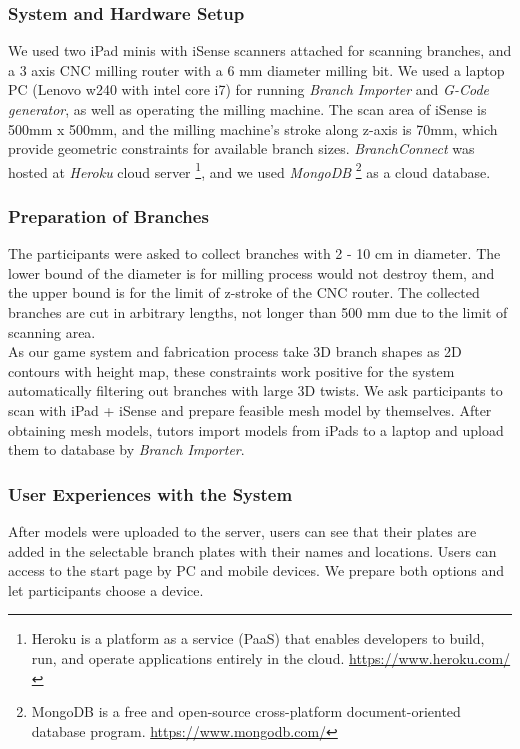 \subsubsection*{System and Hardware Setup}
We used two iPad minis with iSense scanners attached for scanning branches, and a 3 axis CNC milling router with a 6 mm diameter milling bit.
We used a laptop PC (Lenovo w240 with intel core i7) for running \textit{Branch Importer} and \textit{G-Code generator}, as well as operating the milling machine.
The scan area of iSense is 500mm x 500mm, and the milling machine's stroke along z-axis is 70mm, which provide geometric constraints for available branch sizes.
\textit{BranchConnect} was hosted at \textit{Heroku} cloud server \footnote{ Heroku is a platform as a service (PaaS) that enables developers to build, run, and operate applications entirely in the cloud. \url{https://www.heroku.com/}},
and we used \textit{MongoDB} \footnote{ MongoDB is a free and open-source cross-platform document-oriented database program. \url{https://www.mongodb.com/}} as a cloud database.

\subsubsection*{Preparation of Branches}
The participants were asked to collect branches with 2 - 10 cm in diameter.
The lower bound of the diameter is for milling process would not destroy them, and the upper bound is for the limit of z-stroke of the CNC router.
The collected branches are cut in arbitrary lengths, not longer than 500 mm due to the limit of scanning area. \\

As our game system and fabrication process take 3D branch shapes as 2D contours with height map, these constraints work positive for the system automatically filtering out branches with large 3D twists.
We ask participants to scan with iPad + iSense and prepare feasible mesh model by themselves.
After obtaining mesh models, tutors import models from iPads to a laptop and upload them to database by \textit{Branch Importer}.


\subsubsection*{User Experiences with the System}
After models were uploaded to the server, users can see that their plates are added in the selectable branch plates with their names and locations.
Users can access to the start page by PC and mobile devices.
We prepare both options and let participants choose a device.


